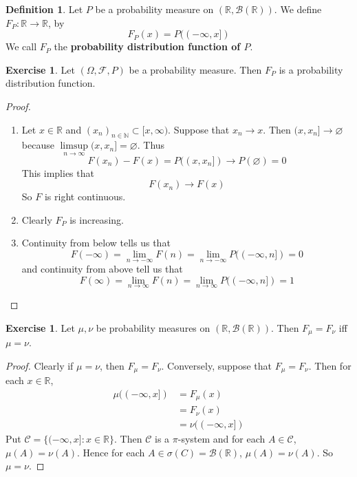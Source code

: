 \documentclass[12pt]{amsart}
\theoremstyle{definition}
\newtheorem{defn}[definition]{Definition}
\newtheorem{ex}[definition]{Exercise}
\newcommand{\sig}{\sigma}
\newcommand{\Om}{\Omega}
\newcommand{\N}{\mathbb{N}}
\newcommand{\R}{\mathbb{R}}
\newcommand{\MC}{\mathcal{C}}
\newcommand{\MB}{\mathcal{B}}
\newcommand{\MF}{\mathcal{F}}
\begin{document}
	\begin{defn}
		Let $P $ be a probability measure on $(\R, \MB(\R))$. We define $F_P: \R \rightarrow \R$, by $$F_P(x) = P((-\infty, x])$$ We call $F_P$ the \textbf{probability distribution function of $P$}.
	\end{defn}
	
	\begin{ex}
		Let $(\Om, \MF, P)$ be a probability measure. Then $F_P$ is a probability distribution function.
	\end{ex}
	
	\begin{proof}
		\begin{enumerate}
			\item Let $x \in \R$ and $(x_n)_{n \in \N} \subset [x, \infty)$. Suppose that $x_n \rightarrow x$. Then $(x, x_n] \rightarrow \varnothing$ because $\limsup\limits_{n \rightarrow \infty} (x,x_n] = \varnothing$. Thus $$F(x_n) - F(x) = P((x, x_n]) \rightarrow P(\varnothing) = 0$$This implies that $$F(x_n) \rightarrow F(x)$$ So $F$ is right continuous.
			\item Clearly $F_P$ is increasing.
			\item Continuity from below tells us that $$F(-\infty) = \lim_{n \rightarrow -\infty}F(n) = \lim_{n \rightarrow -\infty}P((-\infty,n]) = 0$$ and continuity from above tell us that $$F(\infty)  = \lim_{n \rightarrow \infty}F(n) = \lim_{n \rightarrow \infty}P((-\infty, n]) = 1$$ 
		\end{enumerate}
	\end{proof}
	
	\begin{ex}
		Let $\mu, \nu$ be probability measures on $(\R, \MB(\R))$. Then $F_{\mu} = F_{\nu}$ iff $\mu = \nu$.  
	\end{ex}
	
	\begin{proof}
		Clearly if $\mu = \nu$, then $F_{\mu} = F_{\nu}$. Conversely, suppose that $F_{\mu} = F_{\nu}$. Then for each $x \in \R$, 
		\begin{align*}
			\mu((-\infty,x]) 
			&= F_{\mu}(x) \\
			&= F_{\nu}(x)  \\
			&= \nu((-\infty,x])
		\end{align*}
		Put $\MC = \{(-\infty,x]:x \in \R\} $. Then $\MC$ is a $\pi$-system and for each $A \in \MC$, $\mu(A) = \nu(A)$. Hence for each $A \in \sig(C) = \MB(\R)$, $\mu(A) = \nu(A)$. So $\mu = \nu$. 
	\end{proof}
	
\end{document}
